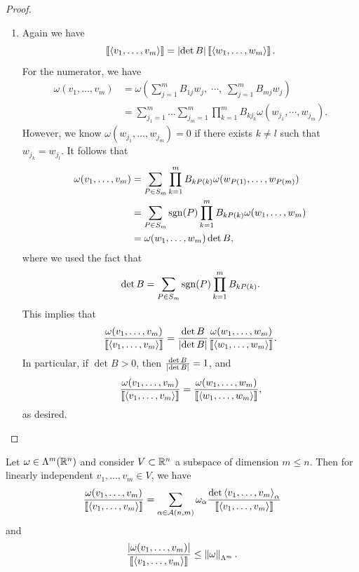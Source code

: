 \documentclass[a4paper]{article}
\begin{document}
\begin{proof}
\begin{enumerate}
    \item Again we have
          \[
            \left\llbracket \left\langle v_1, \dots, v_m \right\rangle \right\rrbracket
            = \left\lvert \det B\right\rvert \left\llbracket \left\langle w_1, \dots, w_m \right\rangle \right\rrbracket.
          \]
          For the numerator, we have
          \[
            \begin{aligned}
              \omega(v_1, \dots, v_m)
               & = \omega \left( \sum_{j=1}^m B_{1j} w_j, \; \cdots, \;
              \sum_{j=1}^m B_{mj} w_j \right)                           \\
               & = \sum_{j_1 = 1}^m \dots \sum_{j_m = 1}^m
              \prod_{k=1}^m B_{k j_k} \omega (w_{j_1}, \cdots, w_{j_m}).
            \end{aligned}
          \]
          However, we know $\omega(w_{j_1}, \dots, w_{j_m}) = 0$ if there
          exists $k \neq l$ such that $w_{j_k} = w_{j_l}$. It follows that
          \[
            \begin{aligned}
              \omega(v_1, \dots, v_m)
               & = \sum_{P \in S_m} \prod_{k=1}^m B_{k P(k)}
              \omega (w_{P(1)}, \dots, w_{P(m)})                     \\
               & = \sum_{P \in S_m} \operatorname{sgn}(P) \prod_{k=1}^m B_{k P(k)}
              \omega(w_1, \dots, w_m)                                \\
               & = \omega(w_1, \dots, w_m) \det B,
            \end{aligned}
          \]
          where we used the fact that
          \[
            \det B = \sum_{P \in S_m} \operatorname{sgn}(P)
            \prod_{k=1}^m B_{k P(k)}.
          \]
          This implies that
          \[
            \frac{\omega(v_1, \dots, v_m)}{\left\llbracket \left\langle v_1, \dots,
                  v_m \right\rangle \right\rrbracket} = \frac{\det B}{\left\lvert \det B\right\rvert}
            \frac{\omega(w_1, \dots, w_m)}{\left\llbracket \left\langle w_1,
                  \dots, w_m \right\rangle \right\rrbracket}.
          \]
          In particular, if $\det B > 0$, then $\frac{\det B}{\left\lvert \det
          B\right\rvert} = 1$, and
          \[
            \frac{\omega(v_1, \dots, v_m)}{\left\llbracket \left\langle v_1, \dots,
                  v_m \right\rangle \right\rrbracket} = \frac{\omega(w_1, \dots, w_m)}{\left\llbracket \left\langle w_1,
                  \dots, w_m \right\rangle \right\rrbracket},
          \]
          as desired.
  \end{enumerate}
\end{proof}

\begin{lemma}
  Let $\omega \in \Lambda^m(\mathbb{R}^n)$ and consider $V \subset \mathbb{R}^n$ a
  subspace of dimension $m \leq n$. Then for linearly independent $v_1,
    \dots, v_m \in V$, we have
  \[
    \frac{\omega(v_1, \dots, v_m)}{\left\llbracket \left\langle v_1, \dots, v_m \right\rangle \right\rrbracket}
    = \sum_{\alpha \in \mathcal{A}(n, m)} \omega_\alpha
    \frac{\det \left\langle v_1, \dots, v_m \right\rangle_\alpha}
    {\left\llbracket \left\langle v_1, \dots, v_m \right\rangle \right\rrbracket}
  \]
  and
  \[
    \frac{\left\lvert \omega(v_1, \dots, v_m)\right\rvert}{\left\llbracket \left\langle v_1, \dots, v_m \right\rangle \right\rrbracket}
    \leq \left\lVert \omega\right\rVert_{\Lambda^m}.
  \]
\end{lemma}
\end{document}
